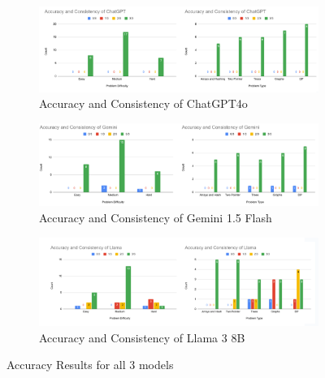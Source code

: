 \documentclass[times, 10pt,twocolumn]{article}
\begin{document}
\begin{figure}[h]
    \centering
    \begin{subfigure}[b]{0.45\textwidth}
        \centering
        \includegraphics[width=\textwidth]{imgs/chat.png} %
        \caption{Accuracy and Consistency of ChatGPT4o}
        \label{fig:sub1}
    \end{subfigure}
    \hfill
    \begin{subfigure}[b]{0.45\textwidth}
        \centering
        \includegraphics[width=\textwidth]{imgs/gemini.png} %
        \caption{Accuracy and Consistency of Gemini 1.5 Flash}
        \label{fig:sub2}
    \end{subfigure}
    \hfill
    \begin{subfigure}[b]{0.45\textwidth}
        \centering
        \includegraphics[width=\textwidth]{imgs/llama.png} %
        \caption{Accuracy and Consistency of Llama 3 8B}
        \label{fig:sub3}
    \end{subfigure}
    \caption{Accuracy Results for all 3 models}
    \label{fig:main}
\end{figure}
\end{document}
